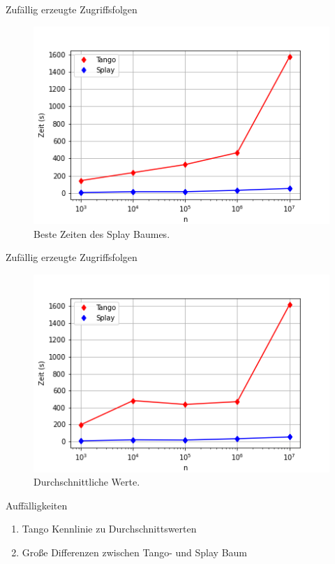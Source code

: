 \documentclass[11pt]{beamer}
\begin{document}
\begin{frame}{Zufällig erzeugte Zugriffsfolgen}
	\begin{figure}[H]
		\centering
		\includegraphics[width=1\textwidth]{"Medien/pres/randomAccess2"}
		\caption{Beste Zeiten des Splay Baumes.}
	\end{figure}
\end{frame}

\begin{frame}{Zufällig erzeugte Zugriffsfolgen}
		\begin{figure}[H]
		\centering
		\includegraphics[width=1\textwidth]{"Medien/pres/randomAccess3"}
		\caption{Durchschnittliche Werte.}
	\end{figure}
\end{frame}


\begin{frame}{Auffälligkeiten}
	\begin{enumerate}
	\item Tango Kennlinie zu Durchschnittswerten
	\item Große Differenzen zwischen Tango- und Splay Baum 
	\end{enumerate}
\end{frame}
\end{document}
